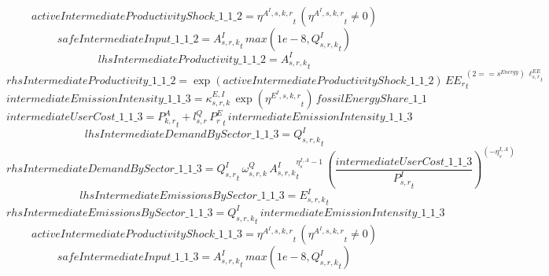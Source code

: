 \begin{dmath*}
activeIntermediateProductivityShock\_1\_1\_2 = {{\eta^{A^{I},s,k,r}}}_{t}\, \left({{\eta^{A^{I},s,k,r}}}_{t}\neq 0\right)
\end{dmath*}
\begin{dmath*}
safeIntermediateInput\_1\_1\_2 = {{A^{I}_{s,r,k}}}_{t}\, max(1e-8,{{Q^{I}_{s,r,k}}}_{t})
\end{dmath*}
\begin{dmath*}
lhsIntermediateProductivity\_1\_1\_2 = {{A^{I}_{s,r,k}}}_{t}
\end{dmath*}
\begin{dmath*}
rhsIntermediateProductivity\_1\_1\_2 = \exp\left({activeIntermediateProductivityShock\_1\_1\_2}\right)\, {{EE_r}}_{t}^{\left(2=={{s^{Energy}}}\right)\, {{\ell^{EE}_{s,r}}}_{t}}
\end{dmath*}
\begin{dmath*}
intermediateEmissionIntensity\_1\_1\_3 = {{\kappa^{E,I}_{s,r,k}}}\, \exp\left({{\eta^{E^{I},s,k,r}}}_{t}\right)\, {fossilEnergyShare\_1\_1}
\end{dmath*}
\begin{dmath*}
intermediateUserCost\_1\_1\_3 = {{P^{A}_{k,r}}}_{t}+{{l^{Q}_{s,r}}}\, {{P^E_r}}_{t}\, {intermediateEmissionIntensity\_1\_1\_3}
\end{dmath*}
\begin{dmath*}
lhsIntermediateDemandBySector\_1\_1\_3 = {{Q^{I}_{s,r,k}}}_{t}
\end{dmath*}
\begin{dmath*}
rhsIntermediateDemandBySector\_1\_1\_3 = {{Q^{I}_{s,r}}}_{t}\, {{\omega^{Q}_{s,r,k}}}\, {{A^{I}_{s,r,k}}}_{t}^{{{\eta^{I,A}_{s}}}-1}\, \left(\frac{{intermediateUserCost\_1\_1\_3}}{{{P^{I}_{s,r}}}_{t}}\right)^{\left(-{{\eta^{I,A}_{s}}}\right)}
\end{dmath*}
\begin{dmath*}
lhsIntermediateEmissionsBySector\_1\_1\_3 = {{E^I_{s,r,k}}}_{t}
\end{dmath*}
\begin{dmath*}
rhsIntermediateEmissionsBySector\_1\_1\_3 = {{Q^{I}_{s,r,k}}}_{t}\, {intermediateEmissionIntensity\_1\_1\_3}
\end{dmath*}
\begin{dmath*}
activeIntermediateProductivityShock\_1\_1\_3 = {{\eta^{A^{I},s,k,r}}}_{t}\, \left({{\eta^{A^{I},s,k,r}}}_{t}\neq 0\right)
\end{dmath*}
\begin{dmath*}
safeIntermediateInput\_1\_1\_3 = {{A^{I}_{s,r,k}}}_{t}\, max(1e-8,{{Q^{I}_{s,r,k}}}_{t})
\end{dmath*}
